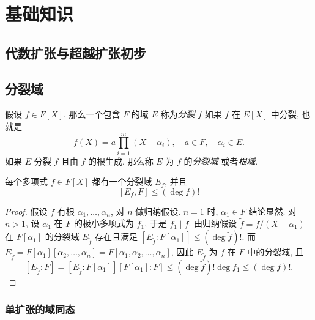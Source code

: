 \chapter{基础知识}

\section{代数扩张与超越扩张初步}

\section{分裂域}

假设 \( f \in F[X] \). 那么一个包含 \( F \) 的域 \( E \) 称为\emph{分裂} \( f
\) 如果 \( f \) 在 \( E[X] \) 中分裂, 也就是
\[
  f(X) = a \prod_{i = 1}^m(X - \alpha_i),\quad a \in F,\quad \alpha_i \in E.
\]
如果 \( E \) 分裂 \( f \) 且由 \( f \) 的根生成, 那么称 \( E \) 为 \( f \)
的\emph{分裂域} 或者\emph{根域}.

\begin{proposition}
  \label{proposition-polynomial-splitting-field-degree}
  每个多项式 \( f \in F[X] \) 都有一个分裂域 \( E_f \), 并且
  \[
    [E_f, F] \leq (\deg f) !
  \]
\end{proposition}
\begin{proof}
  假设 \( f \) 有根 \( \alpha_1, \ldots, \alpha_n \), 对 \( n \) 做归纳假设.
  \( n = 1 \) 时, \( \alpha_1 \in F \) 结论显然.
  对 \( n > 1 \), 设 \( \alpha_1 \) 在 \( F \) 的极小多项式为 \( f_1 \), 于是 \(
  f_1 \mid f \).
  由归纳假设 \( \widetilde{f} = f / (X - \alpha_1) \) 在 \( F[\alpha_1] \)
  的分裂域 \( E_{\widetilde{f}} \) 存在且满足 \( [E_{\widetilde{f}}:F[\alpha_1]]
  \leq (\deg \widetilde{f})! \).
  而 \( E_{\widetilde{f}} = F[\alpha_1][\alpha_2, \ldots, \alpha_n] =
  F[\alpha_1, \alpha_2, \ldots, \alpha_n] \), 因此 \( E_{\widetilde{f}} \) 为 \(
  f \) 在 \( F \) 中的分裂域, 且
  \[
    [E_{\widetilde{f}}: F] = [E_{\widetilde{f}}: F[\alpha_1]][F[\alpha_1]:F]
    \leq (\deg \widetilde{f})!\deg f_1 \leq (\deg f)!.
  \]
\end{proof}

\subsection{单扩张的域同态}

